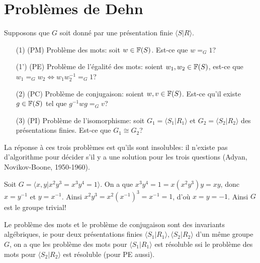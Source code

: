 
\chapter{Problèmes de Dehn}

  Supposons que $G$ soit donné par une présentation finie $\langle S | R\rangle$.
  \begin{itemize}
  \item[(1)] (PM) Problème des mots: soit $w \in \mathbb{F}(S)$. Est-ce que $w =_G 1$?
  \item[(1')] (PE) Problème de l'égalité des mots: soient $w_1, w_2 \in \mathbb{F}(S)$, est-ce que $w_1 =_G w_2 \iff
    w_1w_2^{-1} =_G 1$?
  \item[(2)] (PC) Problème de conjugaison: soient $w, v \in \mathbb{F}(S)$. Est-ce qu'il existe $g \in \mathbb{F}(S)$ tel que
    $g^{-1}wg =_G v$?
  \item[(3)] (PI) Problème de l'isomorphisme: soit $G_1 = \langle S_1|R_1 \rangle$ et $G_2 = \langle S_2 | R_2
    \rangle$ des présentations finies. Est-ce que $G_1 \cong G_2$?
  \end{itemize}

  La réponse à ces trois problèmes est qu'ils sont insolubles: il n'existe pas d'algorithme pour décider s'il
  y a une solution pour les trois questions (Adyan, Novikov-Boone, 1950-1960).

  \begin{ex}
    Soit $G = \langle x,y | x^2y^3 = x^3y^4 = 1\rangle$. On a que $x^3y^4 = 1 = x(x^2y^3)y = xy$, donc $x =
    y^{-1}$ et $y = x^{-1}$. Ainsi $x^2y^3 = x^2(x^{-1})^3 = x^{-1} = 1$, d'où $x = y = -1$. Ainsi $G$ est le
    groupe trivial!
  \end{ex}


  \begin{prop}
    Le problème des mots et le problème de conjugaison sont des invariants algébriques, ie pour deux
    présentations finies $\langle S_1|R_1\rangle, \langle S_2 |R_2\rangle$ d'un même groupe $G$, on a que les
    problème des mots pour $\langle S_1| R_1\rangle$ est résoluble ssi le problème des mots pour $\langle S_2
    | R_2\rangle$ est résoluble (pour PE aussi).
  \end{prop}

